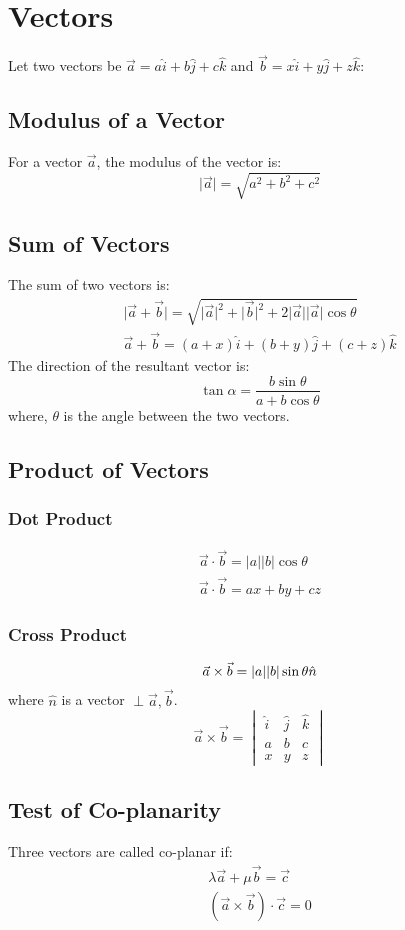\chapter{Vectors}
Let two vectors be $\vec{a}=a\hat{i}+b\hat{j}+c\hat{k}$ and $\vec{b}=x\hat{i}+y\hat{j}+z\hat{k}$:


\section{Modulus of a Vector}
For a vector $\vec{a}$, the modulus of the vector is:
\begin{equation}
	\lvert \vec{a} \rvert = \sqrt{a^2+b^2+c^2}
\end{equation}


\section{Sum of Vectors}
The sum of two vectors is:
\begin{align}
	\lvert \vec{a}+\vec{b} \rvert=\sqrt{\lvert \vec{a} \rvert^2+\lvert \vec{b} \rvert^2+2\lvert \vec{a} \rvert \lvert \vec{a} \rvert\cos \theta}\\
	\vec{a}+\vec{b}=(a+x)\hat{i}+(b+y)\hat{j}+(c+z)\hat{k}
\end{align}
The direction of the resultant vector is:
\begin{equation}
	\tan \alpha=\dfrac{b\sin\theta}{a+b\cos\theta}
\end{equation}
where, $\theta$ is the angle between the two vectors.


\section{Product of Vectors}
\subsection{Dot Product}
\begin{align}
	\vec{a}\cdot\vec{b}=\lvert a \rvert \lvert b \rvert\cos\theta\\
	\vec{a}\cdot\vec{b}=ax+by+cz
\end{align}

\subsection{Cross Product}
\begin{equation}
	\vec{a}\times\vec{b}=\lvert a \rvert \lvert b \rvert \sin\theta \hat{n}\\
\end{equation}
where $\hat{n}$ is a vector $\perp\vec{a},\vec{b}$.
\begin{equation}
	\vec{a}\times\vec{b}=\begin{vmatrix}
		\hat{i}&\hat{j}&\hat{k}\\
		a&b&c\\
		x&y&z
	\end{vmatrix}
\end{equation}


\section{Test of Co-planarity}
Three vectors are called co-planar if:
\begin{align}
	\lambda\vec{a}+\mu\vec{b}=\vec{c}\\
	(\vec{a}\times\vec{b})\cdot\vec{c}=0
\end{align}
